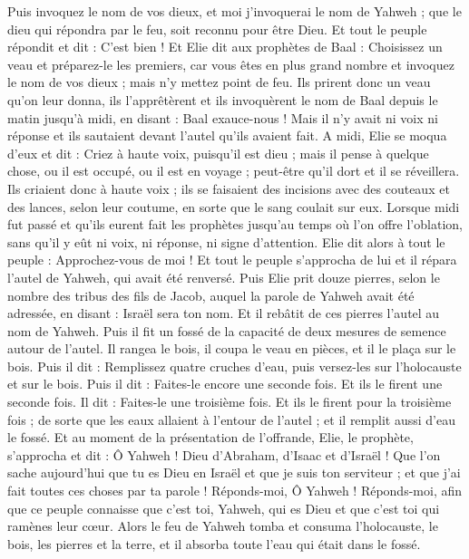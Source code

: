 \begin{multicols}{2}
Puis invoquez le nom de vos dieux, et moi j'invoquerai le nom de Yahweh ; que le dieu qui répondra par le feu, soit reconnu pour être Dieu. Et tout le peuple répondit et dit : C'est bien !
Et Elie dit aux prophètes de Baal : Choisissez un veau et préparez-le les premiers, car vous êtes en plus grand nombre et invoquez le nom de vos dieux ; mais n'y mettez point de feu.
Ils prirent donc un veau qu'on leur donna, ils l'apprêtèrent et ils invoquèrent le nom de Baal depuis le matin jusqu'à midi, en disant : Baal exauce-nous ! Mais il n'y avait ni voix ni réponse et ils sautaient devant l'autel qu'ils avaient fait.
A midi, Elie se moqua d'eux et dit : Criez à haute voix, puisqu’il est dieu ; mais il pense à quelque chose, ou il est occupé, ou il est en voyage ; peut-être qu'il dort et il se réveillera.
Ils criaient donc à haute voix ; ils se faisaient des incisions avec des couteaux et des lances, selon leur coutume, en sorte que le sang coulait sur eux.
Lorsque midi fut passé et qu'ils eurent fait les prophètes jusqu'au temps où l’on offre l'oblation, sans qu'il y eût ni voix, ni réponse, ni signe d’attention.
Elie dit alors à tout le peuple : Approchez-vous de moi ! Et tout le peuple s'approcha de lui et il répara l'autel de Yahweh, qui avait été renversé.
Puis Elie prit douze pierres, selon le nombre des tribus des fils de Jacob, auquel la parole de Yahweh avait été adressée, en disant : Israël sera ton nom.
Et il rebâtit de ces pierres l'autel au nom de Yahweh. Puis il fit un fossé de la capacité de deux mesures de semence autour de l'autel.
Il rangea le bois, il coupa le veau en pièces, et il le plaça sur le bois.
Puis il dit : Remplissez quatre cruches d'eau, puis versez-les sur l'holocauste et sur le bois. Puis il dit : Faites-le encore une seconde fois. Et ils le firent une seconde fois. Il dit : Faites-le une troisième fois. Et ils le firent pour la troisième fois ;
de sorte que les eaux allaient à l'entour de l'autel ; et il remplit aussi d’eau le fossé.
Et au moment de la présentation de l’offrande, Elie, le prophète, s'approcha et dit : Ô Yahweh ! Dieu d'Abraham, d'Isaac et d'Israël ! Que l’on sache aujourd'hui que tu es Dieu en Israël et que je suis ton serviteur ; et que j'ai fait toutes ces choses par ta parole !
Réponds-moi, Ô Yahweh ! Réponds-moi, afin que ce peuple connaisse que c’est toi, Yahweh, qui es Dieu et que c'est toi qui ramènes leur cœur.
Alors le feu de Yahweh tomba et consuma l'holocauste, le bois, les pierres et la terre, et il absorba toute l'eau qui était dans le fossé.

\end{multicols}
